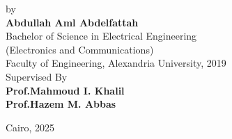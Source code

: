 \begin{center}
\vfill
\small
by\\
\large
\textbf{Abdullah Aml Abdelfattah}\\
\small
Bachelor of Science in Electrical Engineering  \\
(Electronics and Communications)\\
Faculty of Engineering, Alexandria University, 2019\\







\vfill
\small
Supervised By\\
\normalsize
\textbf{Prof.Mahmoud I. Khalil~\\
	  Prof.Hazem M. Abbas}

\vfill
\small
Cairo, 2025\\

\end{center}
